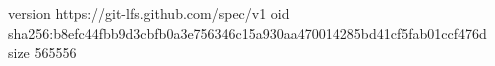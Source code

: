 version https://git-lfs.github.com/spec/v1
oid sha256:b8efc44fbb9d3cbfb0a3e756346c15a930aa470014285bd41cf5fab01ccf476d
size 565556
